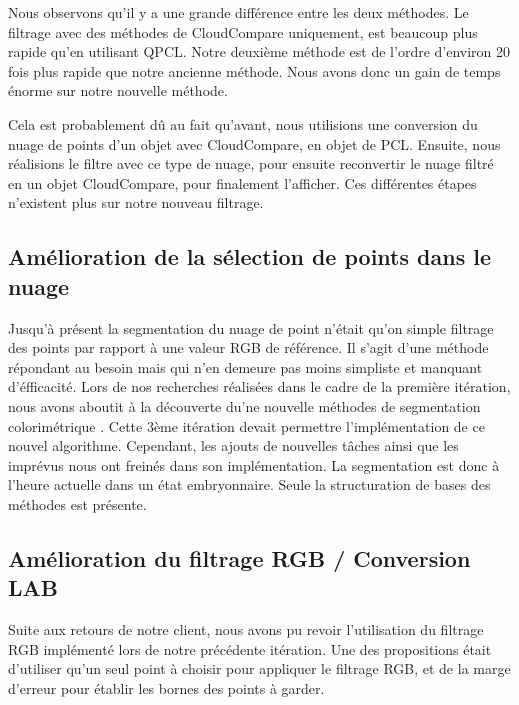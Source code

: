 \documentclass[12pt,titlepage,french]{article}
\begin{document}
Nous observons qu'il y a une grande différence entre les deux méthodes. Le filtrage avec des méthodes de CloudCompare uniquement, est beaucoup plus rapide qu'en utilisant QPCL. Notre deuxième méthode est de l'ordre d'environ 20 fois plus rapide que notre ancienne méthode. Nous avons donc un gain de temps énorme sur notre nouvelle méthode. \newline

Cela est probablement dû au fait qu'avant, nous utilisions une conversion du nuage de points d'un objet avec CloudCompare, en objet de PCL. Ensuite, nous réalisions le filtre avec ce type de nuage, pour ensuite reconvertir le nuage filtré en un objet CloudCompare, pour finalement l'afficher. Ces différentes étapes n'existent plus sur notre nouveau filtrage.

\subsection{Amélioration de la sélection de points dans le nuage}
Jusqu'à présent la segmentation du nuage de point n'était qu'on simple filtrage des points par rapport à une valeur RGB de référence.
Il s'agit d'une méthode répondant au besoin mais qui n'en demeure pas moins simpliste et manquant d'éfficacité.
Lors de nos recherches réalisées dans le cadre de la première itération, nous avons aboutit à la découverte du'ne nouvelle méthodes de segmentation colorimétrique \cite{B01}.
Cette 3ème itération devait permettre l'implémentation de ce nouvel algorithme.
Cependant, les ajouts de nouvelles tâches ainsi que les imprévus nous ont freinés dans son implémentation.
La segmentation est donc à l'heure actuelle dans un état embryonnaire.
Seule la structuration de bases des méthodes est présente.

\subsection{Amélioration du filtrage RGB / Conversion LAB}

Suite aux retours de notre client, nous avons pu revoir l'utilisation du filtrage RGB implémenté lors de notre précédente itération. Une des propositions était d'utiliser qu'un seul point à choisir pour appliquer le filtrage RGB, et de la marge d'erreur pour établir les bornes des points à garder. \newline
\end{document}
